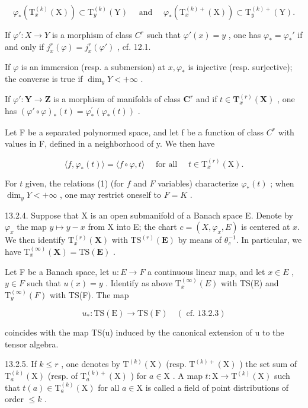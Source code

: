 \[
\varphi_ {*} (\mathrm{T} _ {x} ^ {(k)} (\mathrm{X})) \subset \mathrm{T} _ {y} ^ {(k)} (\mathrm{Y}) \quad \text { and } \quad \varphi_ {*} (\mathrm{T} _ {x} ^ {(k) +} (\mathrm{X})) \subset \mathrm{T} _ {y} ^ {(k) +} (\mathrm{Y}).
\]

If \(\varphi': X \to Y\) is a morphism of class \(C^r\) such that \(\varphi'(x)=y\) , one has \(\varphi_* = \varphi_*'\) if and only if \(j_x^r(\varphi) = j_x^r(\varphi')\) , cf. 12.1.

If \(\varphi\) is an immersion (resp. a submersion) at \(x, \varphi_*\) is injective (resp. surjective); the converse is true if \(\dim_y Y < +\infty\) .

If \(\varphi'\colon\mathbf{Y}\to\mathbf{Z}\) is a morphism of manifolds of class \(\mathbf{C}^{r}\) and if \(t\in\mathbf{T}_{x}^{(r)}(\mathbf{X})\) , one has \((\varphi'\circ\varphi)_{*}(t)=\varphi_{*}^{\prime}(\varphi_{*}(t))\) .

Let F be a separated polynormed space, and let f be a function of class \(C^{r}\) with values in F, defined in a neighborhood of y. We then have

\[
\langle f, \varphi_ {*} (t) \rangle = \langle f \circ \varphi , t \rangle \quad \text {   for   all   } \quad t \in \mathrm{T} _ {x} ^ {(r)} (\mathrm{X}).\tag{1}
\]

For \(t\) given, the relations (1) (for \(f\) and \(F\) variables) characterize \(\varphi_{*}(t)\) ; when \(\dim_y Y < +\infty\) , one may restrict oneself to \(F = K\) .

13.2.4. Suppose that X is an open submanifold of a Banach space E. Denote by \(\varphi_x\) the map \(y \mapsto y - x\) from X into E; the chart \(c = (X, \varphi_x, E)\) is centered at \(x\). We then identify \(\mathrm{T}_x^{(r)}(\mathbf{X})\) with \(\mathrm{TS}^{(r)}(\mathbf{E})\) by means of \(\theta_c^{-1}\). In particular, we have \(\mathrm{T}_x^{(\infty)}(\mathbf{X}) = \mathrm{TS}(\mathbf{E})\) .

Let F be a Banach space, let \(u: E \to F\) a continuous linear map, and let \(x \in E\) , \(y \in F\) such that \(u(x) = y\) . Identify as above \(\mathrm{T}_{x}^{(\infty)}(E)\) with TS(E) and \(\mathrm{T}_{y}^{(\infty)}(F)\) with TS(F). The map

\[
u _ {*} \colon \mathrm{TS(E)} \rightarrow \mathrm{TS(F)} \quad (\text { cf. } 13.2.3)
\]

coincides with the map TS(u) induced by the canonical extension of u to the tensor algebra.

13.2.5. If \(k \leqslant r\) , one denotes by \(\mathrm{T}^{(k)}(\mathrm{X})\) (resp. \(\mathrm{T}^{(k)+}(\mathrm{X})\) ) the set sum of \(\mathrm{T}_a^{(k)}(\mathrm{X})\) (resp. of \(\mathrm{T}_a^{(k)+}(\mathrm{X})\) ) for \(a \in \mathrm{X}\) . A map \(t: \mathrm{X} \to \mathrm{T}^{(k)}(\mathrm{X})\) such that \(t(a) \in \mathrm{T}_a^{(k)}(\mathrm{X})\) for all \(a \in \mathrm{X}\) is called a field of point distributions of order \(\leqslant k\) .

